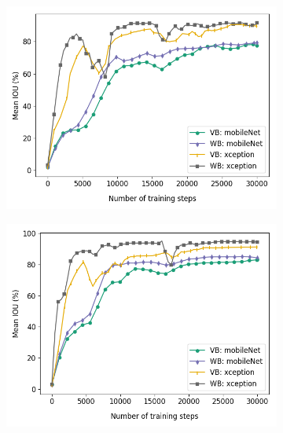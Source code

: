 	\begin{figure}
		\begin{subfigure}{.5\textwidth}
			\centering
			\includegraphics[width=1\linewidth]{images/mobxcep_full}
			\label{4varsa}
			\caption{}
		\end{subfigure}
		\begin{subfigure}{.5\textwidth}
			\centering
			\includegraphics[width=1\linewidth]{images/mobxcep_size}
			\label{4varsb}
			\caption{}
		\end{subfigure}
		\begin{subfigure}{.5\textwidth}
			\centering

\end{subfigure}
\end{figure}
